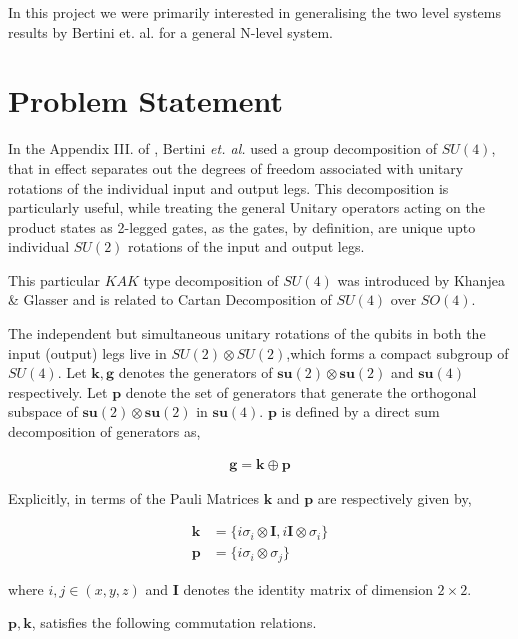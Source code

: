 \documentclass{amsart}
\begin{document}
In this project we were primarily interested in generalising the two level systems results by Bertini et. al. for a general N-level system.

\section{Problem Statement}

In the Appendix III. of \cite{Bertini1}, Bertini \textit{et. al.} used a group decomposition of $SU(4)$, that in effect separates out the degrees of freedom associated with unitary rotations of the individual input and output legs. This decomposition is particularly useful, while treating the general Unitary operators acting on the product states as 2-legged gates, as the gates, by definition, are unique upto individual $SU(2)$ rotations of the input and output legs.

\par This particular $KAK$ type decomposition of $SU(4)$ was introduced by Khanjea \& Glasser \cite{KhanejaGlasser} and is related to Cartan Decomposition \cite{Cartan} of $SU(4)$ over $SO(4)$.

\par The independent but simultaneous unitary rotations of the qubits in both the input (output) legs live in $SU(2)\otimes SU(2)$,which forms a compact subgroup of $SU(4)$. Let $\mathbf{k},\mathbf{g}$ denotes the generators of $\mathbf{su}(2)\otimes \mathbf{su}(2)$ and $\mathbf{su}(4)$ respectively. Let $\mathbf{p}$ denote the set of generators that generate the orthogonal subspace of $\mathbf{su}(2) \otimes \mathbf{su}(2)$ in $\mathbf{su}(4)$. $\mathbf{p}$ is defined by a direct sum decomposition of generators as,

\begin{align}\label{CartanAl}
    \mathbf{g}=\mathbf{k}\oplus \mathbf{p} 
\end{align}

Explicitly, in terms of the Pauli Matrices $\mathbf{k}$ and $\mathbf{p}$ are respectively given by,

\begin{align*}
    \mathbf{k}&=\{i \sigma_i \otimes \mathbf{I}, i \mathbf{I} \otimes\sigma_i \}\\
    \mathbf{p}&=\{i \sigma_i \otimes \sigma_j \}
\end{align*}

where $i,j \in (x,y,z)$ and $\mathbf{I}$ denotes the identity matrix of dimension $2\times2$. 
\par $\mathbf{p},\mathbf{k}$, satisfies the following commutation relations.
\end{document}
